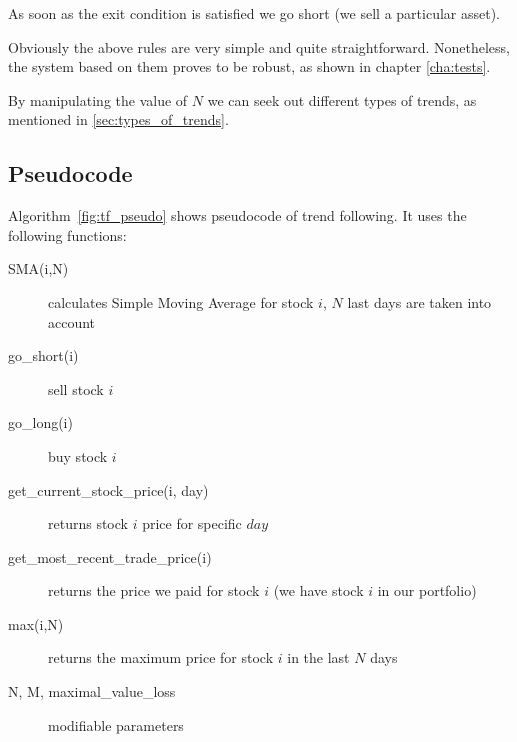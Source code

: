 As soon as the exit condition is satisfied we go short (we sell a particular asset).
 
Obviously the above rules are very simple and quite straightforward.
Nonetheless, the system based on them proves to be robust, as shown in chapter \ref{cha:tests}.
   
By manipulating the value of $N$ we can seek out different types of trends, as mentioned in \ref{sec:types_of_trends}. 

\subsection{Pseudocode}

Algorithm~\ref{fig:tf_pseudo} shows pseudocode of trend following. It uses the following functions:


\begin{description}

\item[SMA(i,N)]
  calculates Simple Moving Average for stock $i$, $N$ last days are taken into account  
\item[go\_short(i)]
  sell stock $i$
\item[go\_long(i)]
  buy stock $i$
\item[get\_current\_stock\_price(i, day)]
  returns stock $i$ price for specific $day$ 
\item[get\_most\_recent\_trade\_price(i)]
  returns the price we paid for stock $i$ (we have stock $i$ in our portfolio)
\item[max(i,N)]
  returns the maximum price for stock $i$ in the last $N$ days
\item[N, M, maximal\_value\_loss]
  modifiable parameters
\end{description}
% 


% 
% 
% 
% 
% 
% 
% 
% 

